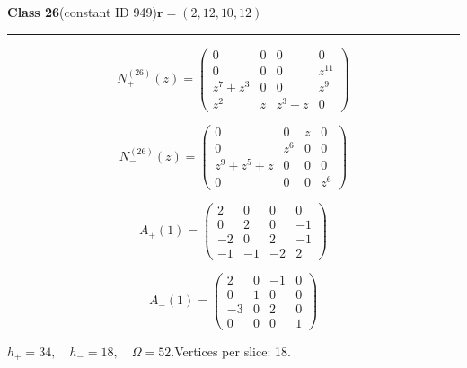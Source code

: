 \noindent\begin{minipage}{\linewidth}
\noindent\textbf{Class 26}\quad\small (constant ID 949)\hfill $\symbf{r}=(2,12,10,12)$
\par\smallskip\noindent\textcolor{rulegray}{\rule{\linewidth}{0.3pt}}
\begin{minipage}[c]{0.495\linewidth}\centering\fontsize{9.7}{12}\selectfont
\setlength{\abovedisplayskip}{4pt}\setlength{\belowdisplayskip}{4pt}
\setlength{\abovedisplayshortskip}{4pt}\setlength{\belowdisplayshortskip}{4pt}
\setlength{\arraycolsep}{3pt}\renewcommand{\arraystretch}{1.08}
\[N_{+}^{(26)}(z)=\begin{pmatrix}0 & 0 & 0 & 0\\0 & 0 & 0 & z^{11}\\z^{7} + z^{3} & 0 & 0 & z^{9}\\z^{2} & z & z^{3} + z & 0\end{pmatrix}\]
\end{minipage}%
\begin{minipage}[c]{0.495\linewidth}\centering\fontsize{9.7}{12}\selectfont
\setlength{\abovedisplayskip}{4pt}\setlength{\belowdisplayskip}{4pt}
\setlength{\abovedisplayshortskip}{4pt}\setlength{\belowdisplayshortskip}{4pt}
\setlength{\arraycolsep}{3pt}\renewcommand{\arraystretch}{1.08}
\[N_{-}^{(26)}(z)=\begin{pmatrix}0 & 0 & z & 0\\0 & z^{6} & 0 & 0\\z^{9} + z^{5} + z & 0 & 0 & 0\\0 & 0 & 0 & z^{6}\end{pmatrix}\]
\end{minipage}%
\par\noindent
\begin{minipage}[c]{0.495\linewidth}\centering\fontsize{9.7}{12}\selectfont
\setlength{\abovedisplayskip}{4pt}\setlength{\belowdisplayskip}{4pt}
\setlength{\abovedisplayshortskip}{4pt}\setlength{\belowdisplayshortskip}{4pt}
\setlength{\arraycolsep}{3pt}\renewcommand{\arraystretch}{1.08}
\[A_{+}(1)=\begin{pmatrix}2 & 0 & 0 & 0\\0 & 2 & 0 & -1\\-2 & 0 & 2 & -1\\-1 & -1 & -2 & 2\end{pmatrix}\]
\end{minipage}%
\begin{minipage}[c]{0.495\linewidth}\centering\fontsize{9.7}{12}\selectfont
\setlength{\abovedisplayskip}{4pt}\setlength{\belowdisplayskip}{4pt}
\setlength{\abovedisplayshortskip}{4pt}\setlength{\belowdisplayshortskip}{4pt}
\setlength{\arraycolsep}{3pt}\renewcommand{\arraystretch}{1.08}
\[A_{-}(1)=\begin{pmatrix}2 & 0 & -1 & 0\\0 & 1 & 0 & 0\\-3 & 0 & 2 & 0\\0 & 0 & 0 & 1\end{pmatrix}\]
\end{minipage}%
\par\smallskip\noindent\small $h_+=34,\quad h_-=18,\quad \Omega=52.$\quad Vertices per slice: 18.
\end{minipage}\par\vfill
\clearpage
